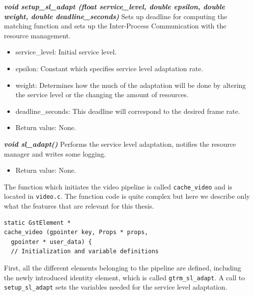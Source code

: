\documentclass[nobiblatex]{LTHthesis}
\begin{document}
\begin{framed}
	\begin{flushleft}	
		\emph{\textbf{{void setup\_sl\_adapt \newline
    (float service\_level, double epsilon, double weight, double deadline\_seconds)}}} \newline
		Sets up deadline for computing the matching function and sets up the 
    Inter-Process Communication with the resource management.
		\begin{itemize}
		\item service\_level: Initial service level.
		\item epsilon: Constant which specifies service level adaptation rate.
		\item weight: Determines how the much of the adaptation will be done 
      by altering the service level or the changing the amount of resources.
		\item deadline\_seconds: This deadline will correspond to the 
      desired frame rate.
		\item Return value: None.
	\end{itemize}
	\end{flushleft}
\end{framed}

\begin{framed}
	\begin{flushleft}	
		\emph{\textbf{{void sl\_adapt()}}}
		Performs the service level adaptation, notifies the resource manager 
    and writes some logging.
		\begin{itemize}
		\item Return value: None.
		\end{itemize}
		\end{flushleft}
\end{framed}

The function which initiates the video pipeline is called 
\texttt{cache\_video} and is located in \texttt{video.c}. The function code
is quite complex but here we describe only what the features that are
relevant for this thesis.

\begin{lstlisting}
static GstElement *
cache_video (gpointer key, Props * props, 
  gpointer * user_data) {
  // Initialization and variable definitions
\end{lstlisting}

First, all the different elements belonging to the pipeline are defined,
including the newly introduced identity element, which is called 
\texttt{gtrm\_sl\_adapt}. A call to \texttt{setup\_sl\_adapt} sets
the variables needed for the service level adaptation.
\end{document}
